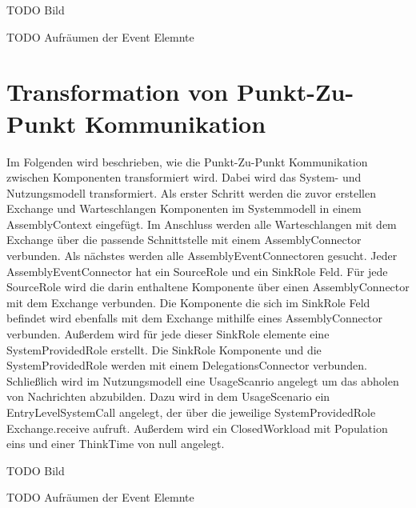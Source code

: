TODO Bild

TODO Aufräumen der Event Elemnte

\section{Transformation von Punkt-Zu-Punkt Kommunikation}
Im Folgenden wird beschrieben, wie die Punkt-Zu-Punkt Kommunikation zwischen Komponenten transformiert wird. Dabei wird das System- und Nutzungsmodell transformiert. Als erster Schritt werden die zuvor erstellen Exchange und Warteschlangen Komponenten im Systemmodell in einem AssemblyContext eingefügt. Im Anschluss werden alle Warteschlangen mit dem Exchange über die passende Schnittstelle mit einem AssemblyConnector verbunden. Als nächstes werden alle AssemblyEventConnectoren gesucht. Jeder AssemblyEventConnector hat ein SourceRole und ein SinkRole Feld. Für jede SourceRole wird die darin enthaltene Komponente über einen AssemblyConnector mit dem Exchange verbunden. Die Komponente die sich im SinkRole Feld befindet wird ebenfalls mit dem Exchange mithilfe eines AssemblyConnector verbunden. Außerdem wird für jede dieser SinkRole elemente eine SystemProvidedRole erstellt. Die SinkRole Komponente und die SystemProvidedRole werden mit einem DelegationsConnector verbunden. Schließlich wird im Nutzungsmodell eine UsageScanrio angelegt um das abholen von Nachrichten abzubilden. Dazu wird in dem UsageScenario ein EntryLevelSystemCall angelegt, der über die jeweilige SystemProvidedRole Exchange.receive aufruft. Außerdem wird ein ClosedWorkload mit Population eins und einer ThinkTime von null angelegt.

TODO Bild

TODO Aufräumen der Event Elemnte

